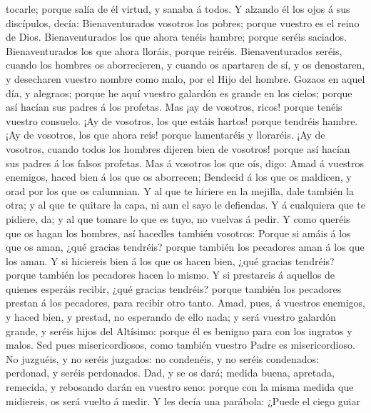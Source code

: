 tocarle; porque salía de él virtud, y sanaba á todos.  Y
alzando él los ojos á sus discípulos, decía: Bienaventurados vosotros
los pobres; porque vuestro es el reino de Dios. 
Bienaventurados los que ahora tenéis hambre; porque seréis saciados.
Bienaventurados los que ahora lloráis, porque reiréis. 
Bienaventurados seréis, cuando los hombres os aborrecieren, y cuando os
apartaren de sí, y os denostaren, y desecharen vuestro nombre como malo,
por el Hijo del hombre.  Gozaos en aquel día, y alegraos;
porque he aquí vuestro galardón es grande en los cielos; porque así
hacían sus padres á los profetas.  Mas ¡ay de vosotros,
ricos! porque tenéis vuestro consuelo.  ¡Ay de vosotros,
los que estáis hartos! porque tendréis hambre. ¡Ay de vosotros, los que
ahora reís! porque lamentaréis y lloraréis.  ¡Ay de
vosotros, cuando todos los hombres dijeren bien de vosotros! porque así
hacían sus padres á los falsos profetas.  Mas á vosotros
los que oís, digo: Amad á vuestros enemigos, haced bien á los que os
aborrecen;  Bendecid á los que os maldicen, y orad por
los que os calumnian.  Y al que te hiriere en la mejilla,
dale también la otra; y al que te quitare la capa, ni aun el sayo le
defiendas.  Y á cualquiera que te pidiere, da; y al que
tomare lo que es tuyo, no vuelvas á pedir.  Y como
queréis que os hagan los hombres, así hacedles también vosotros:
 Porque si amáis á los que os aman, ¿qué gracias
tendréis? porque también los pecadores aman á los que los aman.
 Y si hiciereis bien á los que os hacen bien, ¿qué
gracias tendréis? porque también los pecadores hacen lo mismo.
 Y si prestareis á aquellos de quienes esperáis recibir,
¿qué gracias tendréis? porque también los pecadores prestan á los
pecadores, para recibir otro tanto.  Amad, pues, á
vuestros enemigos, y haced bien, y prestad, no esperando de ello nada; y
será vuestro galardón grande, y seréis hijos del Altísimo: porque él es
benigno para con los ingratos y malos.  Sed pues
misericordiosos, como también vuestro Padre es misericordioso.
 No juzguéis, y no seréis juzgados: no condenéis, y no
seréis condenados: perdonad, y seréis perdonados.  Dad, y
se os dará; medida buena, apretada, remecida, y rebosando darán en
vuestro seno: porque con la misma medida que midiereis, os será vuelto á
medir.  Y les decía una parábola: ¿Puede el ciego guiar
